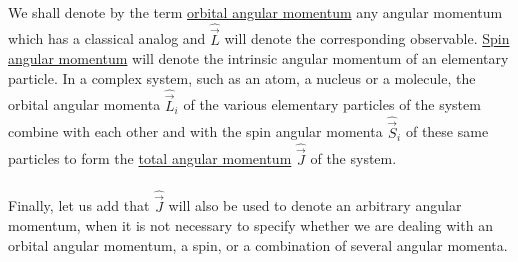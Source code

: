 \paragraph{}
We shall denote by the term {\underline {orbital angular momentum}} any angular momentum which has a classical analog and
$\hat{\vec{L}}$ will denote the corresponding observable. {\underline{Spin angular momentum}} will denote the
intrinsic angular momentum of an elementary particle. In a complex system, such as an atom, a nucleus or a molecule, the orbital
angular momenta $\hat{\vec{L}}_i$ of the various elementary particles of the system combine with each other and with the 
spin angular momenta $\hat{\vec{S}}_i$ of these same particles to form the {\underline {total angular momentum}}
$\hat{\vec{J}}$ of the system.

\paragraph{}
Finally, let us add that $\hat{\vec{J}}$ will also be used to denote an arbitrary angular momentum, when it is
not necessary to specify whether we are dealing with an orbital angular momentum, a spin, or a combination of several angular
momenta.


